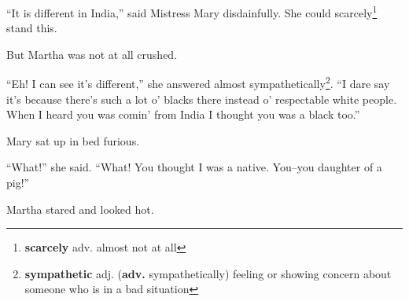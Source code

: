 ``It is different in India,'' said Mistress Mary disdainfully. She could scarcely\footnote{\textbf{scarcely} adv. almost not at all} stand this.

But Martha was not at all crushed.

``Eh! I can see it's different,'' she answered almost sympathetically\footnote{\textbf{sympathetic} adj. (\textbf{adv.} sympathetically) feeling or showing concern about someone who is in a bad situation}. ``I dare say it's because there's such a lot o' blacks there instead o' respectable white people. When I heard you was comin' from India I thought you was a black too.''

Mary sat up in bed furious.

``What!'' she said. ``What! You thought I was a native. You--you daughter of a pig!''

Martha stared and looked hot.
